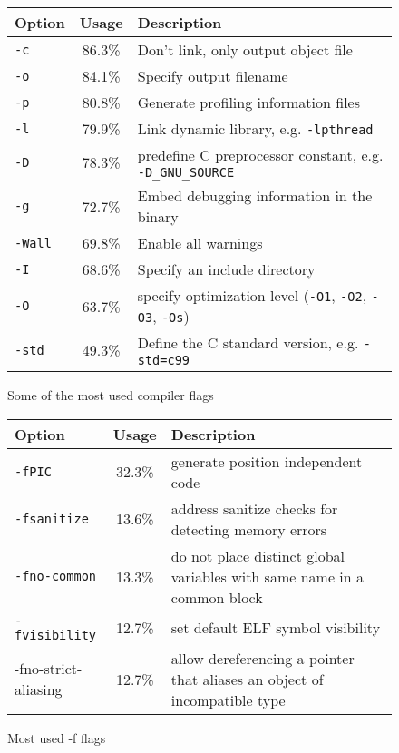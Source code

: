 \documentclass[9pt, a4paper, twocolumn]{article}
\begin{document}
\begin{figure}[H]
	\centering
	\begin{tabular}{l | c | p{}}
		Option & Usage & Description \\
		\hline
		\verb'-c' & 86.3\% & Don't link, only output object file \\
		\verb'-o' & 84.1\% & Specify output filename \\
		\verb'-p' & 80.8\% & Generate profiling information files \\
		\verb'-l' & 79.9\% & Link dynamic library, e.g. \verb'-lpthread' \\
		\verb'-D' & 78.3\% & predefine C preprocessor constant, e.g. \verb'-D_GNU_SOURCE' \\
		\verb'-g' & 72.7\% & Embed debugging information in the binary \\
		\verb'-Wall' & 69.8\% & Enable all warnings \\
		\verb'-I' & 68.6\% & Specify an include directory \\
		\verb'-O' & 63.7\% & specify optimization level (\verb'-O1', \verb'-O2', \verb'-O3', \verb'-Os') \\
		\verb'-std' & 49.3\% & Define the C standard version, e.g. \verb'-std=c99' \\
	\end{tabular}
	\caption{Some of the most used compiler flags}
	\label{fig:usage:all}
\end{figure}

\begin{figure}[H]
	\centering
	\begin{tabular}{l | c | p{}}
		Option & Usage & Description \\
		\hline
		\verb'-fPIC' & 32.3\% & generate position independent code \\
		\verb'-fsanitize' & 13.6\% & address sanitize checks for detecting memory errors \\
		\verb'-fno-common' & 13.3\% & do not place distinct global variables with same name in a common block \\
		\verb'-fvisibility' & 12.7\% & set default ELF symbol visibility \\
		\makecell[l]{-fno-strict- \\ aliasing} & 12.7\% & allow dereferencing a pointer that aliases an object of incompatible type \\
	\end{tabular}
	\caption{Most used -f flags}
	\label{fig:usage:f}
\end{figure}
\end{document}
